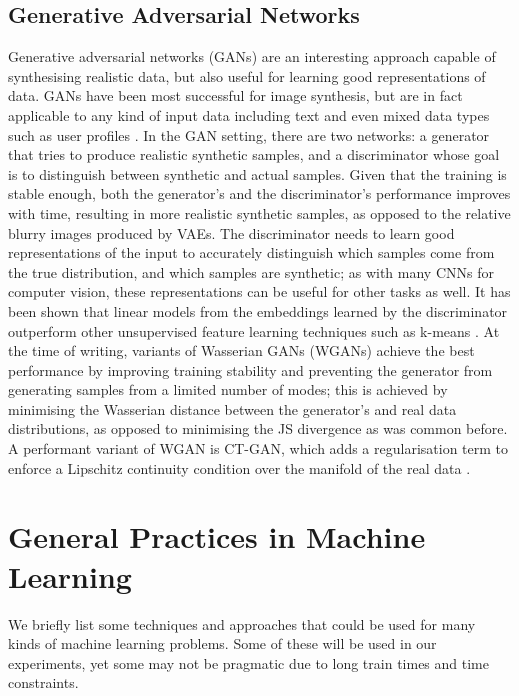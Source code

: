 \subsection{Generative Adversarial Networks}

Generative adversarial networks (GANs) are an interesting approach capable of synthesising realistic data, but also useful for learning good representations of data.
GANs have been most successful for image synthesis, but are in fact applicable to any kind of input data including text \cite{} and even mixed data types such as user profiles \cite{}.
In the GAN setting, there are two networks: a generator that tries to produce realistic synthetic samples, and a discriminator whose goal is to distinguish between synthetic and actual samples.
Given that the training is stable enough, both the generator's and the discriminator's performance improves with time, resulting in more realistic synthetic samples, as opposed to the relative blurry images produced by VAEs.
The discriminator needs to learn good representations of the input to  accurately distinguish which samples come from the true distribution, and which samples are synthetic; as with many CNNs for computer vision, these representations can be useful for other tasks as well.
It has been shown that  linear models  from the embeddings learned by the discriminator outperform other unsupervised feature learning techniques such as k-means \cite{dcgan}.
At the time of writing, variants of Wasserian GANs (WGANs) achieve the best performance by improving training stability and preventing the generator from generating samples from a limited number of modes; this is achieved by minimising the Wasserian distance between the generator's and real data distributions, as opposed to minimising the JS divergence as was common before.
A performant variant of WGAN is CT-GAN, which adds a regularisation term to enforce a Lipschitz continuity condition over the manifold of the real data \cite{ctgan}.

\section{General Practices in Machine Learning}

We briefly list some techniques and approaches that could be used for many kinds of machine learning problems.
Some of these will be used in our experiments, yet some may not be pragmatic due to long train times and time constraints.

